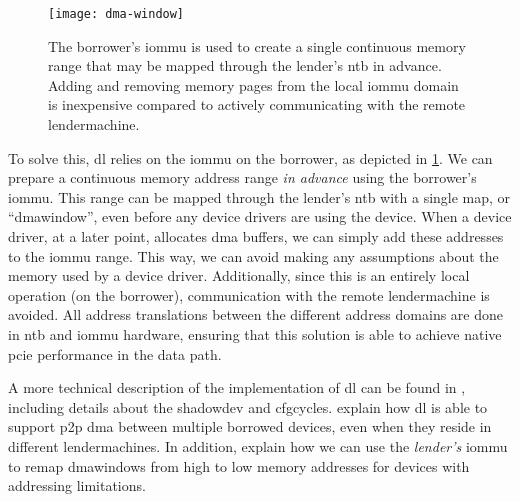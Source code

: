 \begin{figure}
    \centering
    \texttt{[image: dma-window]}
    \caption[The borrower's  is used to create a single continuous memory range that may be mapped through the lender's  in advance. Adding and removing memory pages from the local  domain is inexpensive compared to actively communicating with the remote lender~machine]
    {The \gls{borrower}'s \gls{iommu} is used to create a single continuous memory range that may be mapped through the \gls{lender}'s \gls{ntb} in advance. Adding and removing memory pages from the local \gls{iommu} domain is inexpensive compared to actively communicating with the remote \gls{lendermachine}.}
    \label{fig:dma-window}
\end{figure}




To solve this, \gls{dl} relies on the \gls{iommu} on the \gls{borrower}, as depicted in \cref{fig:dma-window}.
%
We can prepare a continuous memory address range \emph{in advance} using the \gls{borrower}'s \gls{iommu}.
%
This range can be mapped through the \gls{lender}'s \gls{ntb} with a single map, or ``\gls{dmawindow}'', even before any device drivers are using the device.
%
When a device driver, at a later point, allocates \gls{dma} buffers, we can simply add these addresses to the \gls{iommu} range.
%
This way, we can avoid making any assumptions about the memory used by a device driver.
%
Additionally, since this is an entirely local operation (on the \gls{borrower}), communication with the remote \gls{lendermachine} is avoided.
%
All address translations between the different address domains are done in \gls{ntb} and \gls{iommu} hardware, ensuring that this solution is able to achieve native \gls{pcie} performance in the data path.



A more technical description of the implementation of \gls{dl} can be found in , including details about the \gls{shadowdev} and \glspl{cfgcycle}.
%
 explain how \gls{dl} is able to support \gls{p2p} \gls{dma} between multiple borrowed devices, even when they reside in different \glspl{lendermachine}.
%
In addition,  explain how we can use the \emph{\gls{lender}'s} \gls{iommu} to remap \glspl{dmawindow} from high to low memory addresses for devices with addressing limitations.



